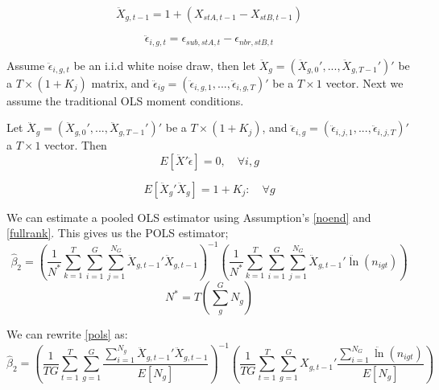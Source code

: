 \begin{equation}
\ddot X_{g,t-1} = 1+(X_{stA,t-1}-X_{stB,t-1})
\end{equation}

\begin{equation}
\ddot \epsilon_{i,g,t} = \epsilon_{sub,stA,t}-\epsilon_{nbr,stB,t}
\end{equation}

Assume $\ddot \epsilon_{i,g,t}$ be an i.i.d white noise draw, then let $\ddot X_{g} = (\ddot X_{g,0}',...,\ddot X_{g,T-1}')'$ be a $T \times (1+K_{j})$ matrix, and $\ddot \epsilon_{ig} = (\ddot \epsilon_{i,g,1},...,\ddot \epsilon_{i,g,T})'$ be a $T \times 1$ vector. Next we assume the traditional OLS moment conditions.

\begin{assumption}\label{noend}
Let  $\ddot X_{g} = (\ddot X_{g,0}', ... ,\ddot X_{g,T-1}')'$ be a $T \times (1+K_{j})$, and $\ddot \epsilon_{i,g} = (\ddot\epsilon_{i,j,1},...,\ddot\epsilon_{i,j,T})'$ a $T \times 1$ vector. Then 
\begin{equation}E[\ddot X'\ddot \epsilon] = 0, \quad \forall i,g\end{equation}
\end{assumption}

\begin{assumption}\label{fullrank}
 \begin{equation}E[\ddot X_{g}'\ddot X_{g}] = 1+K_{j}: \quad \forall g\end{equation}
\end{assumption}

We can estimate a pooled OLS estimator using Assumption's \ref{noend} and \ref{fullrank}. This gives us the POLS estimator;
\begin{equation}\label{pols}
\hat \beta_{2} = \left(\frac{1}{N^{*}} \sum_{k=1}^{T}\sum_{i=1}^{G}\sum_{j=1}^{N_{G}}\ddot X_{g,t-1}'\ddot X_{g,t-1}\right)^{-1}\left(\frac{1}{N^{*}}\sum_{k=1}^{T}\sum_{i=1}^{G}\sum_{j=1}^{N_{G}}\ddot X_{g,t-1}'\ddot \ln(n_{igt})\right)
\end{equation}
\begin{equation}
N^{*} = T(\sum_{g}^{G}N_{g})
\end{equation}

We can rewrite \ref{pols} as:
\begin{equation}\label{pols_2s}
\hat \beta_{2} = \left(\frac{1}{TG} \sum_{t=1}^{T}\sum_{g=1}^{G}\frac{\sum_{i=1}^{N_{g}}\ddot X_{g,t-1}'\ddot X_{g,t-1}}{E[N_{g}]}\right)^{-1}\left(\frac{1}{TG}\sum_{t=1}^{T}\sum_{g=1}^{G}X_{g,t-1}'\frac{\sum_{i=1}^{N_{G}}\ddot \ln(n_{igt})}{E[N_{g}]}\right)
\end{equation}

